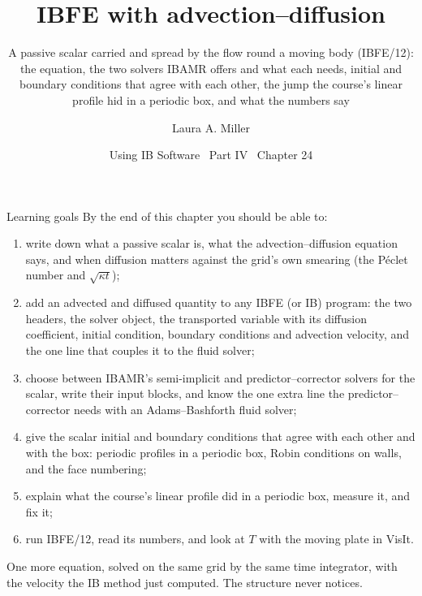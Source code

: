 \documentclass[aspectratio=169,11pt]{beamer}
\title[IBFE with advection--diffusion]{IBFE with advection--diffusion}
\subtitle{A passive scalar carried and spread by the flow round a moving body (IBFE/12): the equation, the two solvers IBAMR offers and what each needs, initial and boundary conditions that agree with each other, the jump the course's linear profile hid in a periodic box, and what the numbers say}
\author[Miller]{Laura A. Miller}
\institute[UArizona]{Department of Mathematics, University of Arizona}
\date{Using IB Software \textbullet\ Part IV \textbullet\ Chapter 24}
\begin{document}
\begin{frame}[plain]
\end{frame}

\begin{frame}{Learning goals}
\label{fr:goals}
\footnotesize By the end of this chapter you should be able to:
\begin{enumerate}
  \item write down what a passive scalar is, what the advection--diffusion equation says, and when diffusion matters against the grid's own smearing (the P\'eclet number and $\sqrt{\kappa t}$);
  \item add an advected and diffused quantity to any IBFE (or IB) program: the two headers, the solver object, the transported variable with its diffusion coefficient, initial condition, boundary conditions and advection velocity, and the one line that couples it to the fluid solver;
  \item choose between IBAMR's semi-implicit and predictor--corrector solvers for the scalar, write their input blocks, and know the one extra line the predictor--corrector needs with an Adams--Bashforth fluid solver;
  \item give the scalar initial and boundary conditions that agree with each other and with the box: periodic profiles in a periodic box, Robin conditions on walls, and the face numbering;
  \item explain what the course's linear profile did in a periodic box, measure it, and fix it;
  \item run IBFE/12, read its numbers, and look at $T$ with the moving plate in VisIt.
\end{enumerate}
\begin{punchbox}
\footnotesize One more equation, solved on the same grid by the same time integrator, with the velocity the IB method just computed. The structure never notices.
\end{punchbox}
\end{frame}
\end{document}

